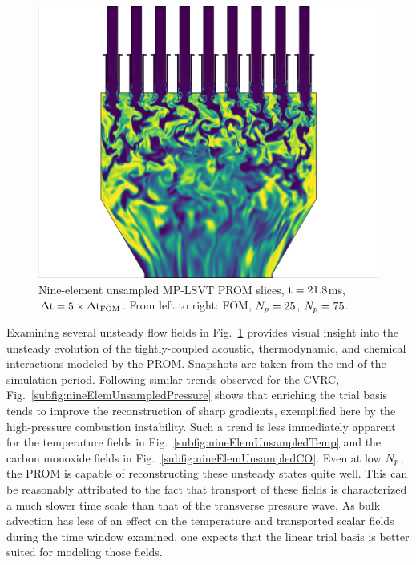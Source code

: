 \begin{figure}
{\begin{minipage}{0.32\linewidth}
		\includegraphics[width=0.99\linewidth,trim={0.5em 0.5em 15.0em 0.5em},clip]{Chapters/HPROMResults/Images/nineElem/unsampled/rom_k75_co_z.png}
	\end{minipage}
	}

	\caption{\label{fig:nineElemUnsampledContours}Nine-element unsampled MP-LSVT PROM slices, $\text{t} = 21.8$ms, $\Delta \text{t} = 5 \times \Delta \text{t}_{\text{FOM}}$. From left to right: FOM, $N_p=25$, $N_p=75$.}
\end{figure}

Examining several unsteady flow fields in Fig.~\ref{fig:nineElemUnsampledContours} provides visual insight into the unsteady evolution of the tightly-coupled acoustic, thermodynamic, and chemical interactions modeled by the PROM. Snapshots are taken from the end of the simulation period. Following similar trends observed for the CVRC, Fig.~\ref{subfig:nineElemUnsampledPressure} shows that enriching the trial basis tends to improve the reconstruction of sharp gradients, exemplified here by the high-pressure combustion instability. Such a trend is less immediately apparent for the temperature fields in Fig.~\ref{subfig:nineElemUnsampledTemp} and the carbon monoxide fields in Fig.~\ref{subfig:nineElemUnsampledCO}. Even at low $N_p$, the PROM is capable of reconstructing these unsteady states quite well. This can be reasonably attributed to the fact that transport of these fields is characterized a much slower time scale than that of the transverse pressure wave. As bulk advection has less of an effect on the temperature and transported scalar fields during the time window examined, one expects that the linear trial basis is better suited for modeling those fields.

